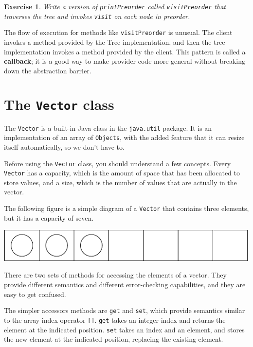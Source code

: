 \documentclass[12pt]{book}
\theoremstyle{exercise}
\newtheorem{exercise}{Exercise}[chapter]
\begin{document}
\begin{exercise}
Write a version of {\tt printPreorder} called
{\tt visitPreorder} that traverses the tree and invokes
{\tt visit} on each node in preorder.
\end{exercise}

The flow of execution for methods like {\tt visitPreorder} is
unusual.  The client invokes a method provided by the Tree
implementation, and then the tree implementation invokes a
method provided by the client.  This pattern is called a
{\bf callback}; it is a good way to make provider code more
general without breaking down the abstraction barrier.



\section {The {\tt Vector} class}
\label{vector}

The {\tt Vector} is a built-in Java class in the {\tt java.util}
package.  It is an implementation of an array of {\tt Objects},
with the added feature that it can resize itself automatically,
so we don't have to.

Before using the {\tt Vector} class, you should understand
a few concepts.  Every {\tt Vector} has a
capacity, which is the amount of space that has been allocated
to store values, and a size, which is the number of values that
are actually in the vector.

The following figure is a simple diagram of a {\tt Vector}
that contains three elements, but it has a capacity of seven.

\includegraphics{figs/vector.pdf}

There are two sets of methods for accessing the elements of
a vector.  They provide different semantics and different
error-checking capabilities, and they are easy to get confused.

The simpler accessors methods are {\tt get} and {\tt set}, which
provide semantics similar to the array index operator {\tt []}.
{\tt get} takes an integer index and returns the element at the
indicated position.  {\tt set} takes an index and an element,
and stores the new element at the indicated position, replacing
the existing element.
\end{document}
